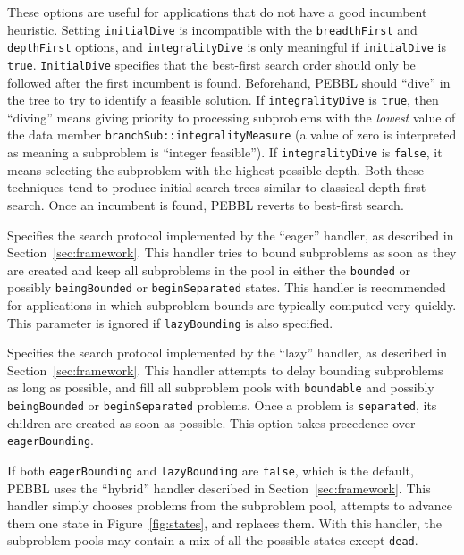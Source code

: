 \groupparams
{} 
These options are useful for
applications that do not have a good incumbent heuristic.  Setting
\texttt{initialDive} is incompatible with the \texttt{breadthFirst}
and \texttt{depthFirst} options, and \texttt{integralityDive} is only
meaningful if \texttt{initialDive} is \texttt{true}.
\texttt{InitialDive} specifies that the best-first search order should
only be followed after the first incumbent is found.  Beforehand,
PEBBL should ``dive'' in the tree to try to identify a feasible
solution.  If \texttt{integralityDive} is \texttt{true}, then
``diving'' means giving priority to processing subproblems with the
\emph{lowest} value of the data member
\texttt{branchSub::integralityMeasure} (a value of zero 
is interpreted as meaning a subproblem is
``integer feasible'').  If \texttt{integralityDive} is \texttt{false},
it means selecting the subproblem with the highest possible depth.
Both these techniques tend to produce initial search trees similar to
classical depth-first search.  Once an incumbent is found, PEBBL
reverts to best-first search.

Specifies the search protocol
implemented by the ``eager'' handler, as described in
Section~\ref{sec:framework}.  This handler tries to bound subproblems
as soon as they are created and keep all subproblems in the pool in
either the \texttt{bounded} or possibly \texttt{beingBounded} or
\texttt{beginSeparated} states.  This handler is recommended for
applications in which subproblem bounds are typically computed very
quickly.  This parameter is ignored if \texttt{lazyBounding} is also
specified.

Specifies the search protocol
implemented by the ``lazy'' handler, as described in
Section~\ref{sec:framework}.  This handler attempts to delay bounding
subproblems as long as possible, and fill all subproblem pools with
\texttt{boundable} and possibly \texttt{beingBounded} or
\texttt{beginSeparated} problems.  Once a problem is
\texttt{separated}, its children are created as soon
as possible.  This option takes precedence over
\texttt{eagerBounding}. 

\vspace{2ex}

If both \texttt{eagerBounding} and \texttt{lazyBounding} are
\texttt{\texttt{false}}, which is the default, PEBBL uses the ``hybrid''
handler described in Section~\ref{sec:framework}.  This handler simply
chooses problems from the subproblem pool, attempts to advance them
one state in Figure~\ref{fig:states}, and replaces them.  With this handler,
the subproblem pools may contain a mix of all the possible states
except \texttt{dead}.

